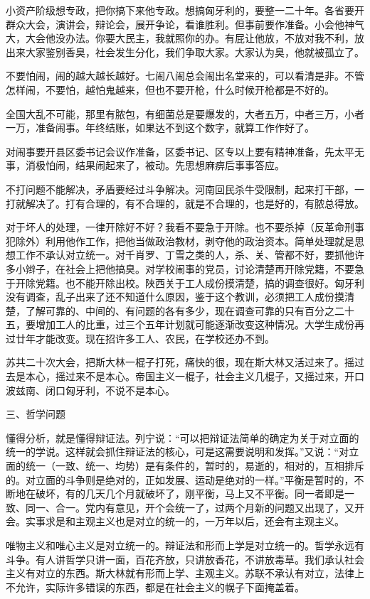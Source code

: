 小资产阶级想专政，把你搞下来他专政。想搞匈牙利的，要整一二十年。各省要开群众大会，演讲会，辩论会，展开争论，看谁胜利。但事前要作准备。小会他神气大，大会他没办法。你要大民主，我就照你的办。有屁让他放，不放对我不利，放出来大家鉴别香臭，社会发生分化，我们争取大家。大家认为臭，他就被孤立了。

不要怕闹，闹的越大越长越好。七闹八闹总会闹出名堂来的，可以看清是非。不管怎样闹，不要怕，越怕鬼越来，但也不要开枪，什么时候开枪都是不好的。

全国大乱不可能，那里有脓包，有细菌总是要爆发的，大者五万，中者三万，小者一万，准备闹事。年终结账，如果达不到这个数字，就算工作作好了。

对闹事要开县区委书记会议作准备，区委书记、区专以上要有精神准备，先太平无事，消极怕闹，结果闹起来了，被动。先思想麻痹后事事答应。

不打问题不能解决，矛盾要经过斗争解决。河南回民杀牛受限制，起来打干部，一打就解决了。打有合理的，有不合理的，就是不合理的，也是好的，有脓总得放。

对于坏人的处理，一律开除好不好？我看不要急于开除。也不要杀掉（反革命刑事犯除外）利用他作工作，把他当做政治教材，剥夺他的政治资本。简单处理就是思想工作不承认对立统一。对千肖罗、丁雪之类的人，杀、关、管都不好，要抓他许多小辫子，在社会上把他搞臭。对学校闹事的党员，讨论清楚再开除党籍，不要急于开除党籍。也不能开除出校。陕西关于工人成份摸清楚，搞的调查很好。匈牙利没有调查，乱子出来了还不知道什么原因，鉴于这个教训，必须把工人成份摸清楚，了解可靠的、中间的、有问题的各有多少，现在调查可靠的只有百分之二十五，要增加工人的比重，过三个五年计划就可能逐渐改变这种情况。大学生成份再过廿年才能改变。现在招许多工人、农民，在学校还办不到。

苏共二十次大会，把斯大林一棍子打死，痛快的很，现在斯大林又活过来了。摇过去是本心，摇过来不是本心。帝国主义一棍子，社会主义几棍子，又摇过来，开口波兹南、闭口匈牙利，不说不是本心。

三、哲学问题

懂得分析，就是懂得辩证法。列宁说：“可以把辩证法简单的确定为关于对立面的统一的学说。这样就会抓住辩证法的核心，可是这需要说明和发挥。”又说：“对立面的统一（一致、统一、均势）是有条件的，暂时的，易逝的，相对的，互相排斥的。对立面的斗争则是绝对的，正如发展、运动是绝对的一样。”平衡是暂时的，不断地在破坏，有的几天几个月就破坏了，刚平衡，马上又不平衡。同一者即是一致、同一、合一。党内有意见，开个会统一了，过两个月新的问题又出现了，又开会。实事求是和主观主义也是对立的统一的，一万年以后，还会有主观主义。

唯物主义和唯心主义是对立统一的。辩证法和形而上学是对立统一的。哲学永远有斗争。有人讲哲学只讲一面，百花齐放，只讲放香花，不讲放毒草。我们承认社会主义有对立的东西。斯大林就有形而上学、主观主义。苏联不承认有对立，法律上不允许，实际许多错误的东西，都是在社会主义的幌子下面掩盖着。

